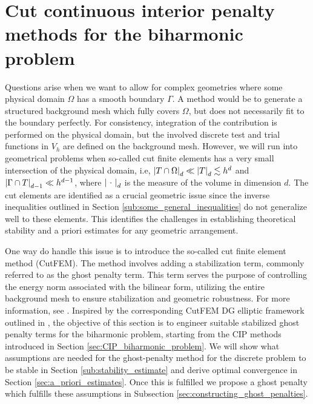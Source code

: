 \newpage
\section{Cut continuous interior penalty methods for the biharmonic problem}%
\label{sec:cutcip_biharmonic_problem}


Questions arise when we want to allow for complex geometries where some physical domain $\Omega $ has a smooth boundary $\Gamma $.
A method would be to generate a structured background mesh which fully covers $\Omega $, but does not necessarily fit to the boundary perfectly.
For consistency, integration of the contribution is performed on the physical domain, but the involved discrete test and trial functions in $V_{h}$ are defined on the background mesh.
However, we will run into geometrical problems when
so-called cut finite elements has a very small intersection of the physical domain, i.e, $\left\lvert  T \cap \Omega   \right\rvert_{d} \ll \left\lvert  T  \right\rvert_{d}  \lesssim h^{d}$ and $\left\lvert  \Gamma \cap T  \right\rvert_{d-1} \ll  h^{d-1}$, where $\left\lvert \ \cdot \   \right\rvert_{d} $ is the
measure of the volume in dimension $d$.
The cut elements are identified as a crucial geometric issue since the inverse inequalities outlined in Section \ref{sub:some_general_inequalities} do not generalize well to these elements. This identifies the challenges in establishing theoretical stability and a priori estimates for any geometric arrangement.

One way do handle this issue is to introduce the so-called cut finite element method (CutFEM).
The method involves adding a stabilization term, commonly referred to as the ghost penalty term.
This term serves the purpose of controlling the energy norm associated with the bilinear form, utilizing the entire background mesh to ensure stabilization and geometric robustness.
For more information, see
\cite{burman2015cutfem, burman2010ghost, burman2022cutfem, burman2012fictitious}.
Inspired by the corresponding CutFEM DG elliptic framework outlined in \cite{gurkan2019stabilized}, the objective of this section is to engineer suitable stabilized ghost penalty terms for the biharmonic problem, starting from the CIP methods introduced in Section \ref{sec:CIP_biharmonic_problem}.
We will show what assumptions are needed for the ghost-penalty method for the discrete problem to be stable in Section \ref{sub:stability_estimate} and derive optimal convergence in Section \ref{sec:a_priori_estimates}.  Once
this is fulfilled we propose a ghost penalty which fulfills these assumptions in Subsection \ref{sec:constructing_ghost_penalties}.


